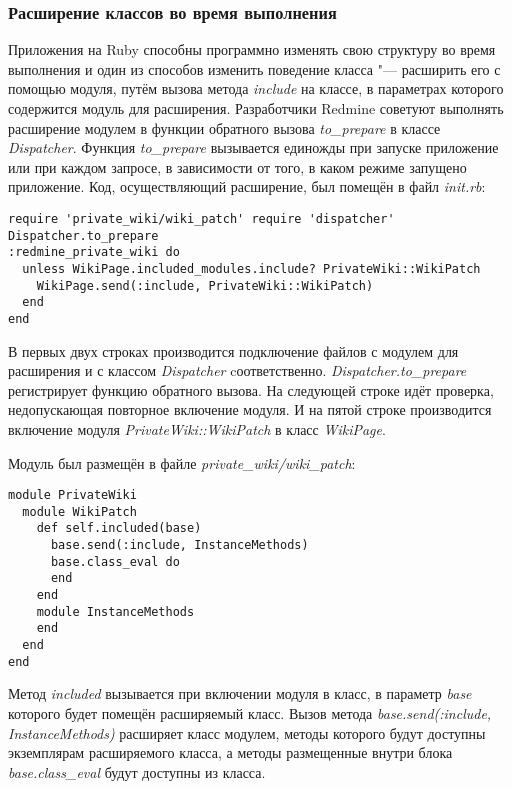 \subsubsection{Расширение классов во время выполнения}
Приложения на Ruby способны программно изменять свою структуру во время
выполнения и один из способов изменить поведение класса "--- расширить его с
помощью модуля, путём вызова метода \textit{include} на классе, в параметрах
которого содержится модуль для расширения. Разработчики Redmine советуют
выполнять расширение модулем в функции обратного вызова \textit{to\_prepare} в
классе \textit{Dispatcher}. Функция \textit{to\_prepare} вызывается единожды
при запуске приложение или при каждом запросе, в зависимости от того, в каком
режиме запущено приложение. Код, осуществляющий расширение, был помещён в файл
\textit{init.rb}:
\small{\begin{lstlisting}
require 'private_wiki/wiki_patch' require 'dispatcher' Dispatcher.to_prepare
:redmine_private_wiki do
  unless WikiPage.included_modules.include? PrivateWiki::WikiPatch
    WikiPage.send(:include, PrivateWiki::WikiPatch)
  end
end
\end{lstlisting}}
В первых двух строках производится подключение файлов с модулем для расширения
и с классом \textit{Dispatcher} cоответственно. \textit{Dispatcher.to\_prepare}
регистрирует функцию обратного вызова. На следующей строке идёт проверка,
недопускающая повторное включение модуля. И на пятой строке производится
включение модуля \textit{PrivateWiki::WikiPatch} в класс \textit{WikiPage}.

Модуль был размещён в файле \textit{private\_wiki/wiki\_patch}:
\small{\begin{lstlisting}
module PrivateWiki
  module WikiPatch
    def self.included(base)
      base.send(:include, InstanceMethods)
      base.class_eval do
      end
    end
    module InstanceMethods
    end
  end
end
\end{lstlisting}}
Метод \textit{included} вызывается при включении модуля в класс, в параметр
\textit{base} которого будет помещён расширяемый класс. Вызов метода
\textit{base.send(:include, InstanceMethods)} расширяет класс модулем, методы
которого будут доступны экземплярам расширяемого класса, а методы размещенные
внутри блока \textit{base.class\_eval} будут доступны из класса.

